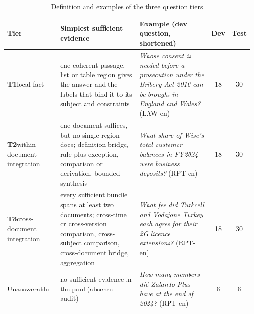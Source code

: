 \begin{table}[tp]
\caption{Definition and examples of the three question tiers}
\label{tab:tiers}
\centering
\small
\renewcommand{\arraystretch}{1.15}
\begin{tabularx}{\textwidth}{@{}>{\raggedright\arraybackslash}p{2.3cm}>{\raggedright\arraybackslash}p{4.4cm}>{\raggedright\arraybackslash}Xcc@{}}
\toprule
Tier & Simplest sufficient evidence & Example (dev question, shortened) & Dev & Test \\
\midrule
\textbf{T1}\newline local fact & one coherent passage, list or table region gives the answer and the labels that bind it to its subject and constraints & \emph{Whose consent is needed before a prosecution under the Bribery Act 2010 can be brought in England and Wales?} (LAW-en) & 18 & 30 \\
\addlinespace
\textbf{T2}\newline within-document integration & one document suffices, but no single region does; definition bridge, rule plus exception, comparison or derivation, bounded synthesis & \emph{What share of Wise's total customer balances in FY2024 were business deposits?} (RPT-en) & 18 & 30 \\
\addlinespace
\textbf{T3}\newline cross-document integration & every sufficient bundle spans at least two documents; cross-time or cross-version comparison, cross-subject comparison, cross-document bridge, aggregation & \emph{What fee did Turkcell and Vodafone Turkey each agree for their 2G licence extensions?} (RPT-en) & 18 & 30 \\
\addlinespace
Unanswerable & no sufficient evidence in the pool (absence audit) & \emph{How many members did Zalando Plus have at the end of 2024?} (RPT-en) & 6 & 6 \\
\bottomrule
\end{tabularx}
\end{table}
